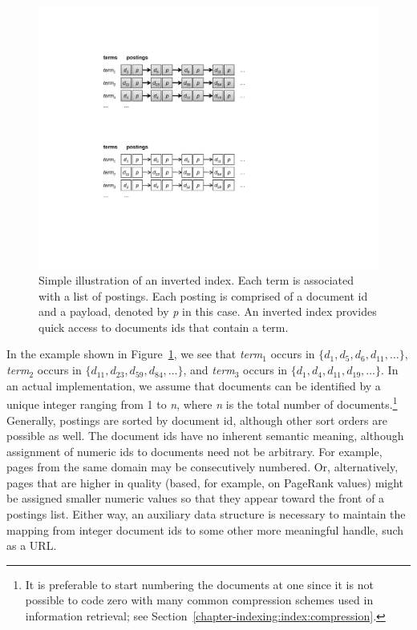 \begin{figure}[t]
\begin{center}
\vspace{0.2cm}
\includegraphics[scale=0.75]{figures/fig-ch4-indexing-inverted-index.pdf}
\vspace{-0.3cm}
\end{center}
\caption{Simple illustration of an inverted index.  Each term is
  associated with a list of postings.  Each posting is comprised of a
  document id and a payload, denoted by \emph{p} in this case.  An
  inverted index provides quick access to documents ids that contain a
  term.}
\label{chapter-indexing:inverted-index}
\end{figure}

In the example shown in Figure~\ref{chapter-indexing:inverted-index},
we see that \emph{term}$_1$ occurs in $\{d_1, d_5, d_6, d_{11},
\ldots\}$, \emph{term}$_2$ occurs in $\{d_{11}, d_{23}, d_{59}, d_{84},
\ldots\}$, and \emph{term}$_3$ occurs in $\{d_1, d_4, d_{11}, d_{19},
\ldots\}$.  In an actual implementation, we assume that documents can
be identified by a unique integer ranging from 1 to \emph{n}, where
\emph{n} is the total number of documents.\footnote{It is preferable to
  start numbering the documents at one since it is not possible to
  code zero with many common compression schemes used in information
  retrieval; see Section~\ref{chapter-indexing:index:compression}.}
Generally, postings are sorted by document id, although other sort
orders are possible as well.  The document ids have no inherent
semantic meaning, although assignment of numeric ids to documents need
not be arbitrary.  For example, pages from the same domain may be
consecutively numbered.  Or, alternatively, pages that are higher in
quality (based, for example, on PageRank values) might be assigned
smaller numeric values so that they appear toward the front of a
postings list.  Either way, an auxiliary data structure is necessary
to maintain the mapping from integer document ids to some other more
meaningful handle, such as a URL.

